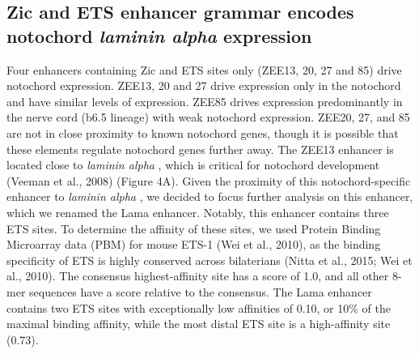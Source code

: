 \subsection{Zic and ETS enhancer grammar encodes notochord \textit{laminin alpha}  expression}

Four enhancers containing Zic and ETS sites only (ZEE13, 20, 27 and 85)  drive notochord expression. ZEE13, 20 and 27 drive expression only in the notochord and have similar levels of expression. ZEE85 drives expression predominantly in the nerve cord (b6.5 lineage) with weak notochord expression. ZEE20, 27, and 85 are not in close proximity to known notochord genes, though it is possible that these elements regulate notochord genes further away. The ZEE13 enhancer is located close to \textit{laminin alpha} , which is critical for notochord development (Veeman et al., 2008) (Figure 4A). Given the proximity of this notochord-specific enhancer to \textit{laminin alpha} , we decided to focus further analysis on this enhancer, which we renamed the Lama enhancer. Notably, this enhancer contains three ETS sites. To determine the affinity of these sites, we used Protein Binding Microarray data (PBM) for mouse ETS-1 (Wei et al., 2010), as the binding specificity of ETS is highly conserved across bilaterians (Nitta et al., 2015; Wei et al., 2010). The consensus highest-affinity site has a score of 1.0, and all other 8-mer sequences have a score relative to the consensus. The Lama enhancer contains two ETS sites with exceptionally low affinities of 0.10, or 10\% of the maximal binding affinity, while the most distal ETS site is a high-affinity site (0.73). 

